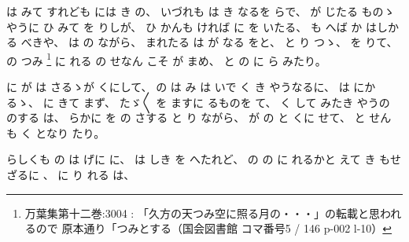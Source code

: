 %
は
みて
すれども
には
き
の、
%
いづれも
は
き
なるを
らで、
%
が
じたる
ものゝ
やうに
ひ
みて
を
りしが、
%
ひ
かんも
ければ
に
を
いたる、
%
も
へば
か
はしかる
べきや、
%
は
の
ながら、
%
まれたる
は
が
なる
をと、
%
と
り
つゝ、
%
を
りて、
%
の
つみ
\footnote{万葉集第十二巻:3004 : 「久方の天つみ空に照る月の・・・」の転載と思われるので
原本通り「つみとする（国会図書館 コマ番号5 / 146 p-002 l-10）}%
に
れる
の
せなん
こそ
が
まめ、
%
と
の
に
ら
みたり。

%
に%
が
は
さるゝが
くにして、
%
の
は
み
は
いで
く
き
やうなるに、
%
は
にか
るゝ、
%
に
きて
まず、
%
たゞ〳〵
を
ますに
るものを
て、
%
く
して
みたき
やうの
のする
は、
%
らかに
を
の
さする
と
り
ながら、
%
が
の
と
くに
せて、
%
と
せん
も
く
となり
たり。

%
らしくも
の
は
げに
に、
%
は
しき
を
へたれど、
%
の
の
に
れるかと
えて
き
もせざるに
、
%
に
り
れる
は、

